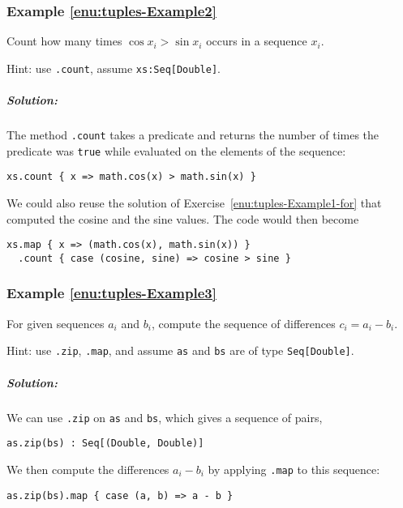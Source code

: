 \subsubsection{Example \label{enu:tuples-Example2}\ref{enu:tuples-Example2}}

Count how many times $\cos x_{i}>\sin x_{i}$ occurs in a sequence
$x_{i}$.

Hint: use \lstinline!.count!,
assume \lstinline!xs:Seq[Double]!.

\subparagraph{Solution: }

The method \lstinline!.count!
takes a predicate and returns the number of times the predicate was
\lstinline!true! while
evaluated on the elements of the sequence:
\begin{lstlisting}
xs.count { x => math.cos(x) > math.sin(x) }
\end{lstlisting}
We could also reuse the solution of Exercise~\ref{enu:tuples-Example1-for}
that computed the cosine and the sine values. The code would then
become
\begin{lstlisting}
xs.map { x => (math.cos(x), math.sin(x)) }
  .count { case (cosine, sine) => cosine > sine }
\end{lstlisting}

\subsubsection{Example \label{enu:tuples-Example3}\ref{enu:tuples-Example3}}

For given sequences $a_{i}$ and $b_{i}$, compute the sequence of
differences $c_{i}=a_{i}-b_{i}$.

Hint: use \lstinline!.zip!,
\lstinline!.map!, and assume
\lstinline!as! and \lstinline!bs!
are of type \lstinline!Seq[Double]!.

\subparagraph{Solution: }

We can use \lstinline!.zip!
on \lstinline!as! and \lstinline!bs!,
which gives a sequence of pairs,
\begin{lstlisting}
as.zip(bs) : Seq[(Double, Double)]
\end{lstlisting}
We then compute the differences $a_{i}-b_{i}$ by applying \lstinline!.map!
to this sequence:
\begin{lstlisting}
as.zip(bs).map { case (a, b) => a - b }
\end{lstlisting}

